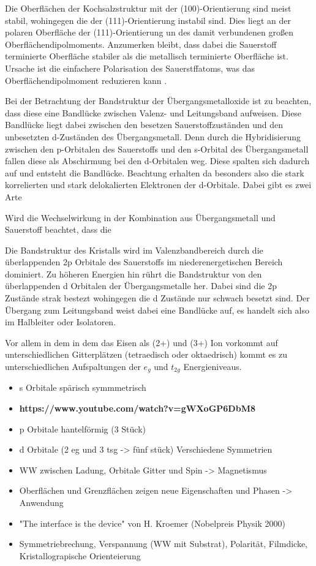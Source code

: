         Die Oberflächen der Kochsalzstruktur mit der (100)-Orientierung sind meist stabil, wohingegen die der (111)-Orientierung instabil sind.
        Dies liegt an der polaren Oberfläche der (111)-Orientierung un des damit verbundenen großen Oberflächendipolmoments. 
        Anzumerken bleibt, dass dabei die Sauerstoff terminierte Oberfläche stabiler als die metallisch terminierte Oberfläche ist.
        Ursache ist die einfachere Polarisation des Sauerstffatoms, was das Oberflächendipolmoment reduzieren kann \cite{al-abadleh_oxide_2003}.

        Bei der Betrachtung der Bandstruktur der Übergangsmetalloxide ist zu beachten, dass diese eine Bandlücke zwischen Valenz- und Leitungsband aufweisen.
        Diese Bandlücke liegt dabei zwischen den besetzen Sauerstoffzuständen und den unbesetzten d-Zuständen des Übergangsmetall.
        Denn durch die Hybridisierung zwischen den p-Orbitalen des Sauerstoffs und den s-Orbital des Übergangsmetall fallen diese als Abschirmung bei den d-Orbitalen weg.
        Diese spalten sich dadurch auf und entsteht die Bandlücke.
        Beachtung erhalten da besonders also die stark korrelierten und stark delokalierten Elektronen der d-Orbitale.
        Dabei gibt es zwei Arte

        Wird die Wechselwirkung in der Kombination aus Übergangsmetall und Sauerstoff beachtet, dass die 

        Die Bandstruktur des Kristalls wird im Valenzbandbereich durch die überlappenden 2p Orbitale des Sauerstoffs im niederenergetischen Bereich dominiert.
        Zu höheren Energien hin rührt die Bandstruktur von den überlappenden d Orbitalen der Übergangsmetalle her.
        Dabei sind die 2p Zustände strak bestezt wohingegen die d Zustände nur schwach besetzt sind.
        Der Übergang zum Leitungsband weist dabei eine Bandlücke auf, es handelt sich also im Halbleiter oder Isolatoren.

        Vor allem in dem  in dem das Eisen als (2+) und (3+) Ion vorkommt auf unterschiedlichen Gitterplätzen (tetraedisch oder oktaedrisch) kommt es zu unterschiedlichen Aufspaltungen der $e_g$ und $t_{2g}$ Energieniveaus.

        \begin{itemize}
            \item s Orbitale spärisch symmmetrisch
            \item \textbf{https://www.youtube.com/watch?v=gWXoGP6DbM8}
            \item p Orbitale hantelförmig (3 Stück)
            \item d Orbitale (2 eg und 3 tsg -> fünf stück) Verschiedene Symmetrien
            \item WW zwischen Ladung, Orbitale Gitter und Spin -> Magnetismus
            \item Oberflächen und Grenzflächen zeigen neue Eigenschaften und Phasen -> Anwendung 
            \item "The interface is the device" von H. Kroemer (Nobelpreis Physik 2000)
            \item Symmetriebrechung, Verspannung (WW mit Substrat), Polarität, Filmdicke, Kristallograpische Orienteierung
        \end{itemize}

